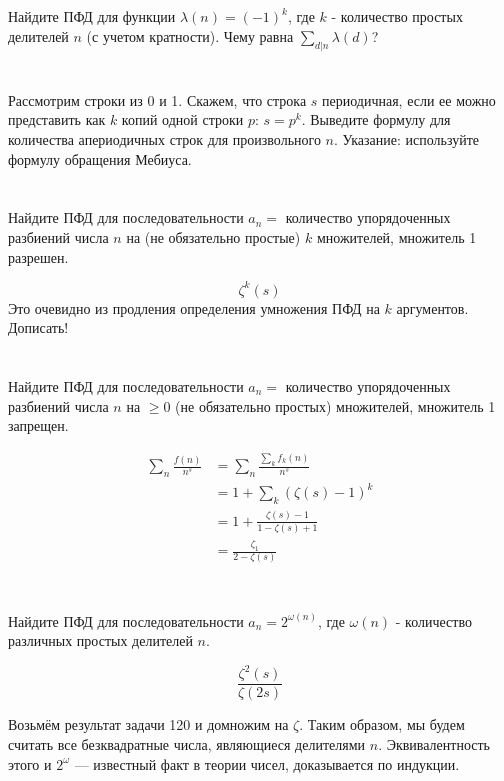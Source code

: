 \section{}
Найдите ПФД для функции $\lambda(n) = (-1)^k$, где $k$ - количество простых делителей $n$ (с учетом кратности). Чему равна $\sum\limits_{d | n} \lambda(d)$?

\section{}
Рассмотрим строки из 0 и 1. Скажем, что строка $s$ периодичная, если ее можно представить как $k$ копий одной строки $p$: $s = p^k$. Выведите формулу для количества апериодичных строк для произвольного $n$. Указание: используйте формулу обращения Мебиуса.

\section{}
Найдите ПФД для последовательности $a_n = $ количество упорядоченных разбиений числа $n$ на (не обязательно простые) $k$ множителей, множитель 1 разрешен.

\[\zeta^k(s)\]
Это очевидно из продления определения умножения ПФД на \(k\) аргументов. Дописать!

\section{}
Найдите ПФД для последовательности $a_n = $ количество упорядоченных разбиений числа $n$ на $\ge 0$ (не обязательно простых) множителей, множитель 1 запрещен.

\begin{align*}
    \sum_n \frac{f(n)}{n^s} & = \sum_n \frac{\sum_k f_k(n)}{n^s}          \\
                            & = 1 + \sum_k (\zeta(s) - 1)^k               \\
                            & = 1 + \frac{\zeta(s) - 1}{1 - \zeta(s) + 1} \\
                            & = \frac{\zeta_1}{2 - \zeta(s)}              \\
\end{align*}

\section{}
Найдите ПФД для последовательности $a_n = 2^{\omega(n)}$, где $\omega(n)$ - количество различных простых делителей $n$.

\[\frac{\zeta^2(s)}{\zeta(2s)}\]

Возьмём результат задачи 120 и домножим на \(\zeta\). Таким образом, мы будем считать все безквадратные числа, являющиеся делителями \(n\). Эквивалентность этого и \(2^\omega\) --- известный факт в теории чисел, доказывается по индукции.

